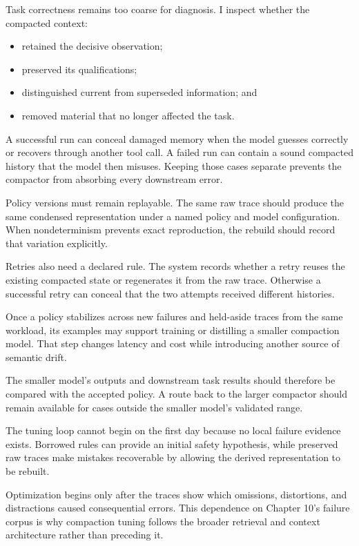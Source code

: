 Task correctness remains too coarse for diagnosis. I inspect whether the compacted context:

\begin{itemize}
\tightlist
\item
  retained the decisive observation;
\item
  preserved its qualifications;
\item
  distinguished current from superseded information; and
\item
  removed material that no longer affected the task.
\end{itemize}

A successful run can conceal damaged memory when the model guesses correctly or recovers through another tool call. A failed run can contain a sound compacted history that the model then misuses. Keeping those cases separate prevents the compactor from absorbing every downstream error.

Policy versions must remain replayable. The same raw trace should produce the same condensed representation under a named policy and model configuration. When nondeterminism prevents exact reproduction, the rebuild should record that variation explicitly.

Retries also need a declared rule. The system records whether a retry reuses the existing compacted state or regenerates it from the raw trace. Otherwise a successful retry can conceal that the two attempts received different histories.

Once a policy stabilizes across new failures and held-aside traces from the same workload, its examples may support training or distilling a smaller compaction model. That step changes latency and cost while introducing another source of semantic drift.

The smaller model's outputs and downstream task results should therefore be compared with the accepted policy. A route back to the larger compactor should remain available for cases outside the smaller model's validated range.

The tuning loop cannot begin on the first day because no local failure evidence exists. Borrowed rules can provide an initial safety hypothesis, while preserved raw traces make mistakes recoverable by allowing the derived representation to be rebuilt.

Optimization begins only after the traces show which omissions, distortions, and distractions caused consequential errors. This dependence on Chapter 10's failure corpus is why compaction tuning follows the broader retrieval and context architecture rather than preceding it.

